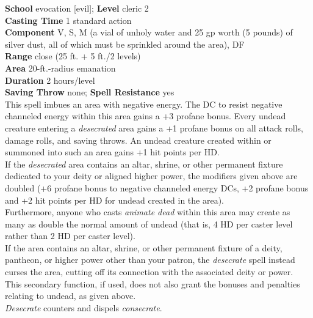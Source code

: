 \textbf{School} evocation [evil]; \textbf{Level} cleric 2\\
\textbf{Casting Time} 1 standard action\\
\textbf{Component} V, S, M (a vial of unholy water and 25 gp worth (5 pounds) of silver dust, all of which must be sprinkled around the area), DF\\
\textbf{Range} close (25 ft. + 5 ft./2 levels)\\
\textbf{Area} 20-ft.-radius emanation\\
\textbf{Duration} 2 hours/level\\
\textbf{Saving Throw} none; \textbf{Spell Resistance} yes\\
This spell imbues an area with negative energy. The DC to resist negative channeled energy within this area gains a +3 profane bonus. Every undead creature entering a \textit{desecrated }area gains a +1 profane bonus on all attack rolls, damage rolls, and saving throws. An undead creature created within or summoned into such an area gains +1 hit points per HD.\\
If the \textit{desecrated }area contains an altar, shrine, or other permanent fixture dedicated to your deity or aligned higher power, the modifiers given above are doubled (+6 profane bonus to negative channeled energy DCs, +2 profane bonus and +2 hit points per HD for undead created in the area).\\
Furthermore, anyone who casts \textit{animate dead }within this area may create as many as double the normal amount of undead (that is, 4 HD per caster level rather than 2 HD per caster level).\\
If the area contains an altar, shrine, or other permanent fixture of a deity, pantheon, or higher power other than your patron, the \textit{desecrate }spell instead curses the area, cutting off its connection with the associated deity or power. This secondary function, if used, does not also grant the bonuses and penalties relating to undead, as given above.\\
\textit{Desecrate }counters and dispels \textit{consecrate}.\\
